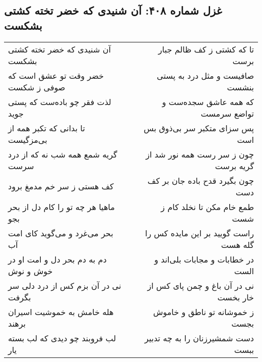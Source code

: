 \begin{center}
\section*{غزل شماره ۴۰۸: آن شنیدی که خضر تخته کشتی بشکست}
\label{sec:0408}
\begin{longtable}{l p{0.5cm} r}
آن شنیدی که خضر تخته کشتی بشکست
&&
تا که کشتی ز کف ظالم جبار برست
\\
خضر وقت تو عشق است که صوفی ز شکست
&&
صافیست و مثل درد به پستی بنشست
\\
لذت فقر چو باده‌ست که پستی جوید
&&
که همه عاشق سجده‌ست و تواضع سرمست
\\
تا بدانی که تکبر همه از بی‌مزگیست
&&
پس سزای متکبر سر بی‌ذوق بس است
\\
گریه شمع همه شب نه که از درد سرست
&&
چون ز سر رست همه نور شد از گریه برست
\\
کف هستی ز سر خم مدمغ برود
&&
چون بگیرد قدح باده جان بر کف دست
\\
ماهیا هر چه تو را کام دل از بحر بجو
&&
طمع خام مکن تا نخلد کام ز شست
\\
بحر می‌غرد و می‌گوید کای امت آب
&&
راست گویید بر این مایده کس را گله هست
\\
دم به دم بحر دل و امت او در خوش و نوش
&&
در خطابات و مجابات بلی‌اند و الست
\\
نی در آن بزم کس از درد دلی سر بگرفت
&&
نی در آن باغ و چمن پای کس از خار بخست
\\
هله خامش به خموشیت اسیران برهند
&&
ز خموشانه تو ناطق و خاموش بجست
\\
لب فروبند چو دیدی که لب بسته یار
&&
دست شمشیرزنان را به چه تدبیر ببست
\\
\end{longtable}
\end{center}
